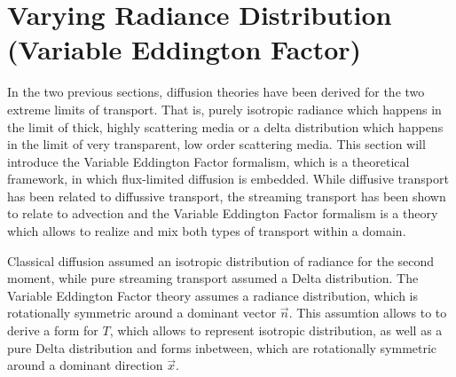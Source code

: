 \section{Varying Radiance Distribution (Variable Eddington Factor)}
\label{sec:fld_vef}

In the two previous sections, diffusion theories have been derived for the two extreme limits of transport. That is, purely isotropic radiance which happens in the limit of thick, highly scattering media or a delta distribution which happens in the limit of very transparent, low order scattering media. This section will introduce the Variable Eddington Factor formalism, which is a theoretical framework, in which flux-limited diffusion is embedded. While diffusive transport has been related to diffussive transport, the streaming transport has been shown to relate to advection and the Variable Eddington Factor formalism is a theory which allows to realize and mix both types of transport within a domain.


Classical diffusion assumed an isotropic distribution of radiance for the second moment, while pure streaming transport assumed a Delta distribution. The Variable Eddington Factor theory assumes a radiance distribution, which is rotationally symmetric around a dominant vector $\vec{n}$. This assumtion allows to to derive a form for $T$, which allows to represent isotropic distribution, as well as a pure Delta distribution and forms inbetween, which are rotationally symmetric around a dominant direction $\vec{x}$.


